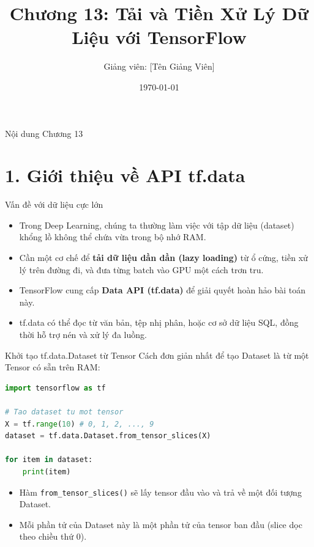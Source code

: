 \documentclass[aspectratio=169]{beamer}
\title[Chương 13: Tải \& Tiền Xử Lý Dữ Liệu]{Chương 13: Tải và Tiền Xử Lý Dữ Liệu với TensorFlow}
\author[Giảng viên]{Giảng viên: [Tên Giảng Viên]}
\institute[Đại Học Đông Á]{Đại Học Đông Á}
\date{\today}
\begin{document}
\begin{frame}
    \titlepage
\end{frame}

\begin{frame}{Nội dung Chương 13}
    \tableofcontents
\end{frame}

\section{1. Giới thiệu về API tf.data}

\begin{frame}{Vấn đề với dữ liệu cực lớn}
    \begin{itemize}
        \item Trong Deep Learning, chúng ta thường làm việc với tập dữ liệu (dataset) khổng lồ không thể chứa vừa trong bộ nhớ RAM.
        \item Cần một cơ chế để \textbf{tải dữ liệu dần dần (lazy loading)} từ ổ cứng, tiền xử lý trên đường đi, và đưa từng batch vào GPU một cách trơn tru.
        \item TensorFlow cung cấp \textbf{Data API (tf.data)} để giải quyết hoàn hảo bài toán này.
        \item tf.data có thể đọc từ văn bản, tệp nhị phân, hoặc cơ sở dữ liệu SQL, đồng thời hỗ trợ nén và xử lý đa luồng.
    \end{itemize}
\end{frame}

\begin{frame}[fragile]{Khởi tạo tf.data.Dataset từ Tensor}
    Cách đơn giản nhất để tạo Dataset là từ một Tensor có sẵn trên RAM:
\begin{lstlisting}[language=Python]
import tensorflow as tf

# Tao dataset tu mot tensor
X = tf.range(10) # 0, 1, 2, ..., 9
dataset = tf.data.Dataset.from_tensor_slices(X)

for item in dataset:
    print(item)
\end{lstlisting}
    \begin{itemize}
        \item Hàm \texttt{from\_tensor\_slices()} sẽ lấy tensor đầu vào và trả về một đối tượng Dataset.
        \item Mỗi phần tử của Dataset này là một phần tử của tensor ban đầu (slice dọc theo chiều thứ 0).
    \end{itemize}
\end{frame}
\end{document}
